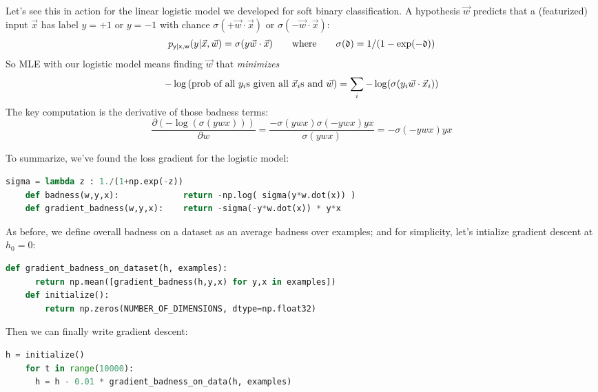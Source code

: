   Let's see this in action for the linear logistic model we developed for soft
  binary classification.  A hypothesis $\vec w$ predicts that a (featurized)
  input $\vec x$ has label $y=+1$ or $y=-1$ with chance $\sigma(+ \vec w \cdot \vec x)$
  or $\sigma(- \vec w \cdot \vec x)$:
  $$
    p_{\mathsf{y}|\mathsf{x},\mathsf{w}}(y|\vec x,\vec w) = \sigma(y \vec w \cdot \vec x)
    \quad\quad
    \text{where}
    \quad\quad
    \sigma(\mathfrak{d}) = 1/(1-\exp(-\mathfrak{d}))
  $$
  So MLE with our logistic model means finding $\vec w$ that \emph{minimizes}
  $$
    -\log\left(\text{prob of all $y_i$s given all $\vec x_i$s and $\vec w$}\right)
    =
    \sum_i -\log(\sigma(y_i \vec w\cdot \vec x_i))
  $$
  The key computation is the derivative of those badness terms:
  $$
    \frac{\partial (-\log(\sigma(y w x)))}{\partial w}
    =
    \frac{-\sigma(y w x)\sigma(-y w x) y x}{\sigma(y w x)}
    =
    - \sigma(-y w x) y x
  $$


  \vspace{\baselineskip}

  To summarize, we've found the loss gradient for the logistic model:
  \begin{lstlisting}[language=Python, basicstyle=\footnotesize\ttfamily]
    sigma = lambda z : 1./(1+np.exp(-z))
    def badness(w,y,x):             return -np.log( sigma(y*w.dot(x)) )
    def gradient_badness(w,y,x):    return -sigma(-y*w.dot(x)) * y*x
  \end{lstlisting}
  As before, we define overall badness on a dataset as an average badness over
  examples; and for simplicity, let's intialize gradient descent at $h_0=0$:
  \begin{lstlisting}[language=Python, basicstyle=\footnotesize\ttfamily]
    def gradient_badness_on_dataset(h, examples):
      return np.mean([gradient_badness(h,y,x) for y,x in examples])
    def initialize():
        return np.zeros(NUMBER_OF_DIMENSIONS, dtype=np.float32)
  \end{lstlisting}
  Then we can finally write gradient descent:
  \begin{lstlisting}[language=Python, basicstyle=\footnotesize\ttfamily]
    h = initialize()
    for t in range(10000):
      h = h - 0.01 * gradient_badness_on_data(h, examples)
  \end{lstlisting}

